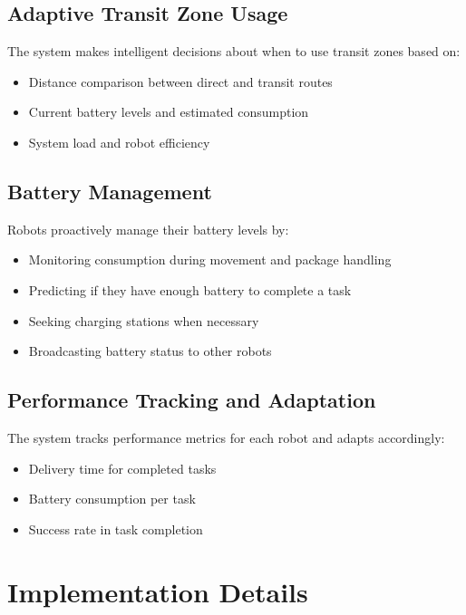 \documentclass[12pt,a4paper]{article}
\begin{document}
\subsection{Adaptive Transit Zone Usage}

The system makes intelligent decisions about when to use transit zones based on:

\begin{itemize}
    \item Distance comparison between direct and transit routes
    \item Current battery levels and estimated consumption
    \item System load and robot efficiency
\end{itemize}

\subsection{Battery Management}

Robots proactively manage their battery levels by:

\begin{itemize}
    \item Monitoring consumption during movement and package handling
    \item Predicting if they have enough battery to complete a task
    \item Seeking charging stations when necessary
    \item Broadcasting battery status to other robots
\end{itemize}

\subsection{Performance Tracking and Adaptation}

The system tracks performance metrics for each robot and adapts accordingly:

\begin{itemize}
    \item Delivery time for completed tasks
    \item Battery consumption per task
    \item Success rate in task completion
\end{itemize}

\section{Implementation Details}
\end{document}
